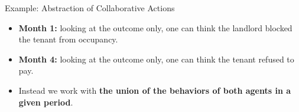 \documentclass[9pt,aspectratio=169]{beamer}
\begin{document}
{\begin{frame}{Example: Abstraction of Collaborative Actions}
\begin{figure}
  \end{figure}
  \vspace{-2mm}
  \footnotesize
  \begin{itemize}
    \item<2-> \textbf{Month 1:} looking at the outcome only, one can think the \textcolor{ConflictOrange}{landlord} blocked the \textcolor{ConflictBlue}{tenant} from occupancy.
    \item<3-> \textbf{Month 4:} looking at the outcome only, one can think the \textcolor{ConflictBlue}{tenant} refused to pay.
    \item<4-> Instead we work with \textbf{the union of the behaviors of both agents in a given period}.
  \end{itemize}
\end{frame}
}
\end{document}
